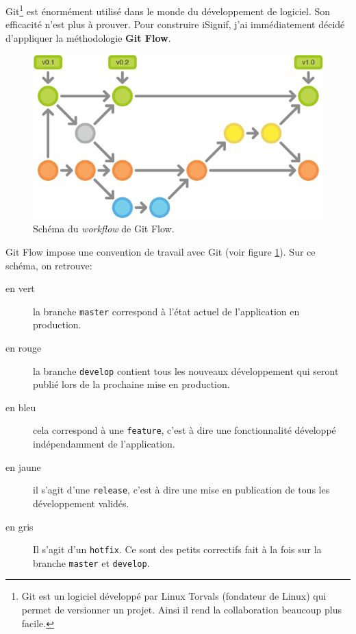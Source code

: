 \documentclass[]{report}
\begin{document}
    Git\footnote{Git est un logiciel développé par Linux Torvals (fondateur de Linux) qui permet de versionner un projet. Ainsi il rend la collaboration beaucoup plus facile.} est énormément utilisé dans le monde du développement de logiciel. Son efficacité n'est plus à prouver. Pour construire iSignif, j'ai immédiatement décidé d'appliquer la méthodologie \textbf{Git Flow}.

    \begin{figure}
      \includegraphics[width=\linewidth]{img/git-flow.png}
      \caption{Schéma du \textit{workflow} de Git Flow.}
      \label{fig:git-flow}
    \end{figure}

    Git Flow impose une convention de travail avec Git (voir figure \ref{fig:git-flow}). Sur ce schéma, on retrouve:

    \begin{description}
      \item[en vert] la branche \verb|master| correspond à l'état actuel de l'application en production.
      \item[en rouge] la branche \verb|develop| contient tous les nouveaux développement qui seront publié lors de la prochaine mise en production.
      \item[en bleu] cela correspond à une \verb|feature|, c'est à dire une fonctionnalité développé indépendamment de l'application.
      \item[en jaune] il s'agit d'une \verb|release|, c'est à dire une mise en publication de tous les développement validés.
      \item[en gris] Il s'agit d'un \verb|hotfix|. Ce sont des petits correctifs fait à la fois sur la branche \verb|master| et \verb|develop|.
    \end{description}
\end{document}
